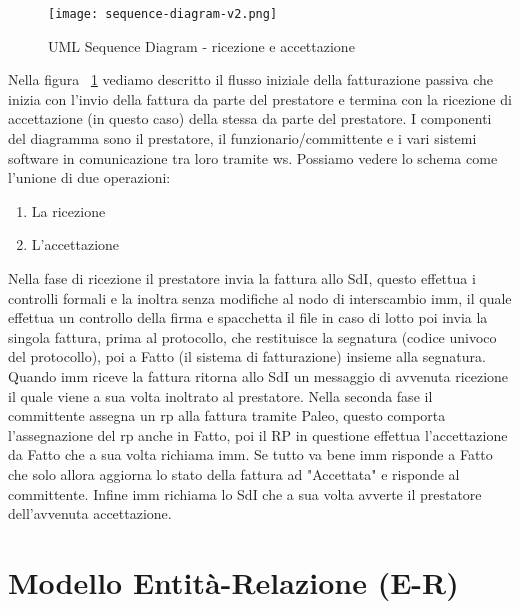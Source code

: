\begin{figure}[H]
    \centering
    \texttt{[image: sequence-diagram-v2.png]}
    \caption{UML Sequence Diagram - ricezione e accettazione}
    \label{fig:SequenceDiagram}
\end{figure}

Nella figura ~\ref{fig:SequenceDiagram} vediamo descritto il flusso iniziale della fatturazione passiva che inizia con l'invio della fattura da parte del prestatore e termina con la ricezione di accettazione (in questo caso) della stessa da parte del prestatore.
I componenti del diagramma sono il prestatore, il funzionario/committente e i vari sistemi software in comunicazione tra loro tramite \Gls{ws}.
Possiamo vedere lo schema come l'unione di due operazioni:
\begin{enumerate}
\item La ricezione
\item L'accettazione
\end{enumerate}
Nella fase di ricezione il prestatore invia la fattura allo SdI, questo effettua i controlli formali e la inoltra senza modifiche al nodo di interscambio \Gls{imm}, il quale effettua un controllo della firma e spacchetta il file in caso di lotto poi invia la singola fattura, prima al  protocollo, che restituisce la segnatura (codice univoco del protocollo), poi a Fatto (il sistema di fatturazione) insieme alla segnatura.
Quando \Gls{imm} riceve la fattura ritorna allo SdI un messaggio di avvenuta ricezione il quale viene a sua volta inoltrato al prestatore.
Nella seconda fase il committente assegna un \Gls{rp} alla fattura tramite Paleo, questo comporta l'assegnazione del \Gls{rp} anche in Fatto, poi il RP in questione effettua l'accettazione da Fatto che a sua volta richiama \Gls{imm}.
Se tutto va bene \Gls{imm} risponde a Fatto che solo allora aggiorna lo stato della fattura ad "Accettata" e risponde al committente.
Infine \Gls{imm} richiama lo SdI che a sua volta avverte il prestatore dell'avvenuta accettazione.


\newpage

\section{Modello Entità-Relazione (E-R)}

